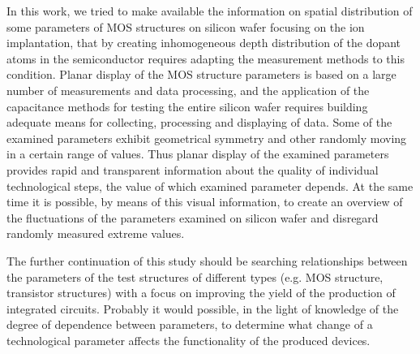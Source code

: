 \iffalse
\par V tejto práci sme sa pokúsili o sprístupnenie informacií o
plošnom rozložení niektorých parametrov štruktúr MOS na kremíkovej
doske so zameraním sa na proces iónovej implantácie, ktorá vytváraním
nehomogénneho hĺbkového rozloženia prímesných atómov v polovodiči
vyžaduje prispôsobenie metód merania tejto podmienke. Plošné
zobrazenie parametrov štruktúr MOS je založené na veľkom množstve
meraní a spracovaní dát a aplikácia kapacitných metód na testovanie
celej kremíkovej dosky si vyžaduje vybudovanie adekvátnych
prostriedkov zberu, spracovania a zobrazenia dát. Niektoré zo
skúmaných parametrov vykazujú geometrickú symetriu a iné sa náhodne
pohybujú v určitom intervale hodnôt. Plošné zobrazenie skúmaných
parametrov tak poskytuje rýchlu a prehľadnú informáciu o kvalite
jednotlivých technologických krokov, od ktorých hodnota skúmaného
parametra závisí. Zároveň si možno pomocou tejto vizuálnej informácie
vytvoriť predstavu o fluktuáciách skúmaných parametrov na kremíkovej
doske a neprikladať váhu náhodne zmeraným extrémnym hodnotám.
\fi
\par In this work, we tried to make available the information on spatial
distribution of some parameters of MOS structures on silicon wafer
focusing on the ion implantation, that by creating inhomogeneous depth
distribution of the dopant atoms in the semiconductor requires
adapting the measurement methods to this condition. Planar display of
the MOS structure parameters is based on a large number of
measurements and data processing, and the application of the
capacitance methods for testing the entire silicon wafer requires
building adequate means for collecting, processing and displaying of
data. Some of the examined parameters exhibit geometrical symmetry and
other randomly moving in a certain range of values. Thus planar
display of the examined parameters provides rapid and transparent
information about the quality of individual technological steps, the
value of which examined parameter depends. At the same time it is
possible, by means of this visual information, to create an overview
of the fluctuations of the parameters examined on silicon wafer and
disregard randomly measured extreme values.

\iffalse
\par Ďalšímm pokračovanímm predkladanej práce by malo byť hľadanie
súvislostí medzi parametrami testovacích štruktúr rôznych druhov
(napr.štruktúra MOS, tranzistorové štruktúry) so zameraním na
zlepšenie výťažnosti výroby integrovaných obvodov. Pravdepodobne by
bolo možné na základe poznatkov o miere závislosti medzi jednotlivými
parametrami rozhodnúť, aká zmena technologického parametra ovplyvní
funkčnosť produkovanej súčiastky.
\fi
\par The further continuation of this study should be searching
relationships between the parameters of the test structures of
different types (e.g. MOS structure, transistor structures) with a
focus on improving the yield of the production of integrated
circuits. Probably it would possible, in the light of knowledge of the
degree of dependence between parameters, to determine what change of a
technological parameter affects the functionality of the produced
devices.

